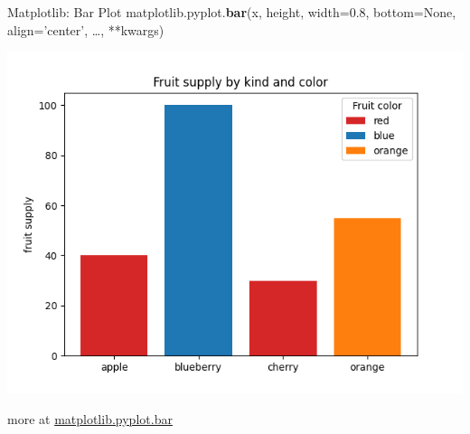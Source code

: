 \documentclass{beamer}
\begin{document}
    \begin{frame}[fragile]{Matplotlib: Bar Plot}
        matplotlib.pyplot.\textbf{bar}(x, height, width=0.8, bottom=None, align='center', \dots, **kwargs)\\
        \begin{center}
            \includegraphics[width=\textwidth,height=0.6\textheight,keepaspectratio]{figures/bar.png}\\
        \end{center}
        more at \href{https://matplotlib.org/stable/api/_as_gen/matplotlib.pyplot.bar.html}{matplotlib.pyplot.bar}
    \end{frame}
\end{document}
